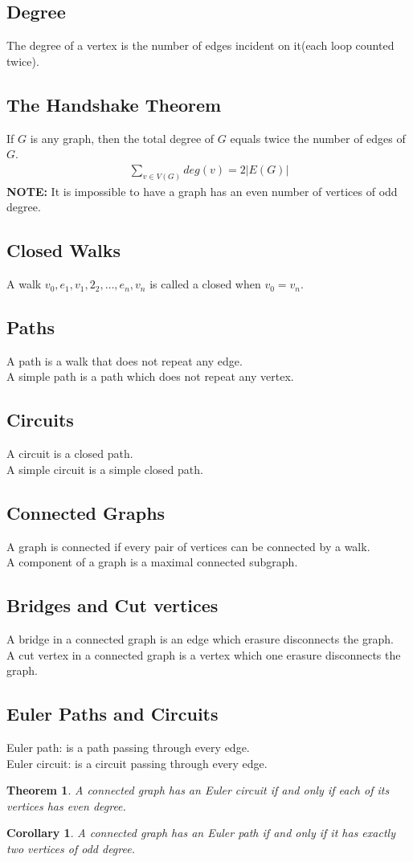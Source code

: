 \documentclass{article}
\newtheorem{thm}{Theorem}
\newtheorem{corollary}{Corollary}
\begin{document}
\begin{spacing}{1.5}
\subsection{Degree}
The degree of a vertex is the number of edges incident on it(each loop counted twice). 
\subsection{The Handshake Theorem}
If $G$ is any graph, then the total degree of $G$ equals twice the number of edges of $G$.
\begin{align}
    \sum_{v \in V(G)} deg(v) = 2\left\lvert E(G) \right\rvert 
\end{align}
\textbf{NOTE:} It is impossible to have a graph has an even number of vertices of odd degree. 
\subsection{Closed Walks}
A walk $v_0,e_1,v_1,2_2,\dots,e_n,v_n$ is called a closed when $v_0 = v_n$. 
\subsection{Paths}
A path is a walk that does not repeat any edge.\\
A simple path is a path which does not repeat any vertex.
\subsection{Circuits}
A circuit is a closed path.\\
A simple circuit is a simple closed path.
\subsection{Connected Graphs}
A graph is connected if every pair of vertices can be connected by a walk.\\
A component of a graph is a maximal connected subgraph.
\subsection{Bridges and Cut vertices}
A bridge in a connected graph is an edge which erasure disconnects the graph. \\
A cut vertex in a connected graph is a vertex which one erasure disconnects the graph. 
\subsection{Euler Paths and Circuits}
Euler path: is a path passing through every edge.\\ 
Euler circuit: is a circuit passing through every edge.
\begin{thm}
    A connected graph has an Euler circuit if and only if each of its vertices has even degree. 
\end{thm}
\begin{corollary}
    A connected graph has an Euler path if and only if it has exactly two vertices of odd degree. 
\end{corollary}

\end{spacing}
\end{document}
